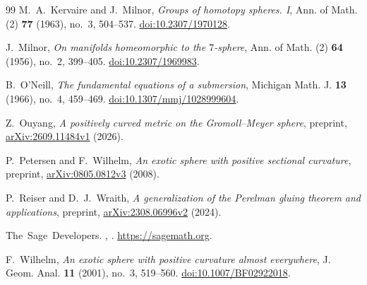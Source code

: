 \documentclass[12pt]{amsart}
\numberwithin{equation}{section}
\theoremstyle{remark}
\begin{document}
\begin{thebibliography}{99}
M.~A.~Kervaire and J.~Milnor,
\emph{Groups of homotopy spheres. I},
Ann. of Math. (2) \textbf{77} (1963), no.~3, 504--537.
\href{https://doi.org/10.2307/1970128}{doi:10.2307/1970128}.

J.~Milnor,
\emph{On manifolds homeomorphic to the \(7\)-sphere},
Ann. of Math. (2) \textbf{64} (1956), no.~2, 399--405.
\href{https://doi.org/10.2307/1969983}{doi:10.2307/1969983}.

B.~O'Neill,
\emph{The fundamental equations of a submersion},
Michigan Math. J. \textbf{13} (1966), no.~4, 459--469.
\href{https://doi.org/10.1307/mmj/1028999604}{doi:10.1307/mmj/1028999604}.

Z.~Ouyang,
\emph{A positively curved metric on the Gromoll--Meyer sphere},
preprint, \href{https://arxiv.org/abs/2609.11484v1}{arXiv:2609.11484v1}
(2026).

P.~Petersen and F.~Wilhelm,
\emph{An exotic sphere with positive sectional curvature},
preprint, \href{https://arxiv.org/abs/0805.0812v3}{arXiv:0805.0812v3}
(2008).

P.~Reiser and D.~J.~Wraith,
\emph{A generalization of the Perelman gluing theorem and applications},
preprint, \href{https://arxiv.org/abs/2308.06996v2}{arXiv:2308.06996v2}
(2024).

The~Sage~Developers.
,
.
\newblock \href{https://sagemath.org}{https://sagemath.org}.



F.~Wilhelm,
\emph{An exotic sphere with positive curvature almost everywhere},
J. Geom. Anal. \textbf{11} (2001), no.~3, 519--560.
\href{https://doi.org/10.1007/BF02922018}{doi:10.1007/BF02922018}.


\end{thebibliography}
\end{document}
